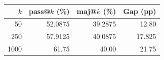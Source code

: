 \begin{table}[t]
\centering
\small
\begin{tabular}{rrrr}
\toprule
$k$ & pass@$k$ (\%) & maj@$k$ (\%) & Gap (pp) \\
\midrule
50 & 52.0875 & 39.2875 & 12.80 \\
250 & 57.9125 & 40.0875 & 17.825 \\
1000 & 61.75 & 40.00 & 21.75 \\
\bottomrule
\end{tabular}
\end{table}
